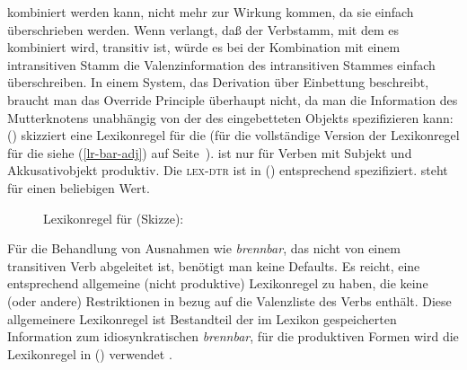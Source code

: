 kombiniert werden kann, nicht mehr zur Wirkung kommen, da sie einfach überschrieben werden.
Wenn \zb \bars verlangt, daß der Verbstamm, mit dem es kombiniert wird, transitiv ist, würde es bei
der Kombination mit einem intransitiven Stamm die Valenzinformation des intransitiven Stammes
einfach überschreiben.
In einem System, das Derivation über Einbettung beschreibt, braucht man das Override Principle
überhaupt nicht, da man die Information des Mutterknotens unabhängig von der des eingebetteten
Objekts spezifizieren kann: () skizziert eine Lexikonregel für die \bard (für die
vollständige Version der Lexikonregel für die \bard siehe (\ref{lr-bar-adj}) auf Seite~\pageref{lr-bar-adj}).
\bard ist nur für Verben mit Subjekt und Akkusativobjekt produktiv. Die \textsc{lex-dtr} ist in
() entsprechend spezifiziert. \etag\is{\etag} steht für einen beliebigen Wert.

\begin{figure}[htbp]
\eas
\label{lr-bard-skizze}
Lexikonregel für \bard (Skizze):\\
\zs
\vspace{-\baselineskip}\end{figure}

Für die Behandlung von Ausnahmen wie \zb \emph{brennbar}, das nicht von einem transitiven Verb
abgeleitet ist, benötigt man keine Defaults. Es reicht, eine entsprechend allgemeine (nicht
produktive) Lexikonregel zu haben, die keine (oder andere) Restriktionen in bezug auf die Valenzliste des Verbs enthält. 
Diese allgemeinere Lexikonregel ist Bestandteil der im Lexikon gespeicherten Information
zum idiosynkratischen \emph{brennbar}, für die produktiven Formen wird die Lexikonregel in ()
verwendet \citep{Riehemann98a}.



